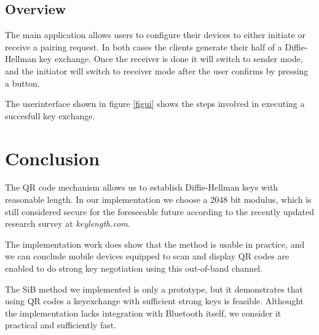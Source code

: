 \documentclass[conference, 11pt]{sty/IEEEtran}
\begin{document}
\subsection{Overview}
\label{ssec:overview}
The main application allows users to configure their devices to either initiate or receive a pairing request.
In both cases the clients generate their half of a Diffie-Hellman key exchange.
Once the receiver is done it will switch to sender mode, and the initiator will switch to receiver mode after the user confirms by pressing a button.

The userinterface shown in figure \ref{figui} shows the steps involved in executing a succesfull key exchange.

\section{Conclusion}
\label{sec:conclusion}


The QR code mechanism allows us to establish Diffie-Hellman keys with reasonable length. In our implementation we choose a 2048 bit modulus, which is still considered secure for the foreseeable future according to the recently updated research survey at \textit{keylength.com}\cite{keylengthdotcom}.

The implementation work does show that the method is usable in practice, and we can conclude mobile devices equipped to scan and display QR codes are enabled to do strong key negotiation using this out-of-band channel.

The SiB method we implemented is only a prototype, but it demonstrates that using QR codes a keyexchange with sufficient strong keys is feasible. Althought the implementation lacks integration with Bluetooth itself, we consider it practical and sufficiently fast.


\newpage
\end{document}
